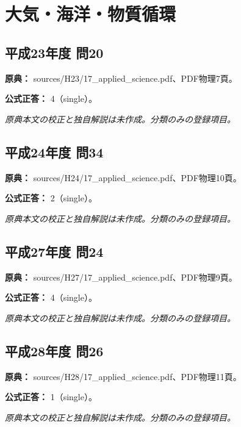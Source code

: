 \section{大気・海洋・物質循環}

\subsection{平成23年度 問20}
\label{q:h23-reg-applied-20}

\noindent\textbf{原典：} sources/H23/17\_applied\_science.pdf、PDF物理7頁。

\textbf{公式正答：} 4（single）。

\par\textit{原典本文の校正と独自解説は未作成。分類のみの登録項目。}

\subsection{平成24年度 問34}
\label{q:h24-reg-applied-34}

\noindent\textbf{原典：} sources/H24/17\_applied\_science.pdf、PDF物理10頁。

\textbf{公式正答：} 2（single）。

\par\textit{原典本文の校正と独自解説は未作成。分類のみの登録項目。}

\subsection{平成27年度 問24}
\label{q:h27-reg-applied-24}

\noindent\textbf{原典：} sources/H27/17\_applied\_science.pdf、PDF物理9頁。

\textbf{公式正答：} 4（single）。

\par\textit{原典本文の校正と独自解説は未作成。分類のみの登録項目。}

\subsection{平成28年度 問26}
\label{q:h28-reg-applied-26}

\noindent\textbf{原典：} sources/H28/17\_applied\_science.pdf、PDF物理11頁。

\textbf{公式正答：} 1（single）。

\par\textit{原典本文の校正と独自解説は未作成。分類のみの登録項目。}

